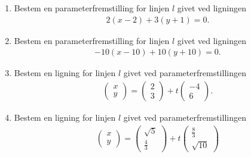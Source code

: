 \begin{enumerate}[label=\roman*)]
\item Bestem en parameterfremstilling for linjen $l$ givet ved ligningen 
\begin{align*}
2(x-2) + 3(y+1) = 0.
\end{align*}
\item Bestem en parameterfremstilling for linjen $l$ givet ved ligningen 
\begin{align*}
-10(x-10) + 10(y+10) = 0.
\end{align*}
\item Bestem en ligning for linjen $l$ givet ved parameterfremstillingen 
\begin{align*}
\begin{pmatrix}
x \\ y
\end{pmatrix}
= 
\begin{pmatrix}
2 \\ 3
\end{pmatrix}
+
t
\begin{pmatrix}
-4 \\ 6
\end{pmatrix}.
\end{align*}
\item Bestem en ligning for linjen $l$ givet ved parameterfremstillingen 
\begin{align*}
\begin{pmatrix}
x \\ y
\end{pmatrix}
= 
\begin{pmatrix}
\sqrt{5} \\ \frac{4}{3}
\end{pmatrix}
+
t
\begin{pmatrix}
\frac{8}{3} \\ \sqrt{10}
\end{pmatrix}
\end{align*}
\end{enumerate}

